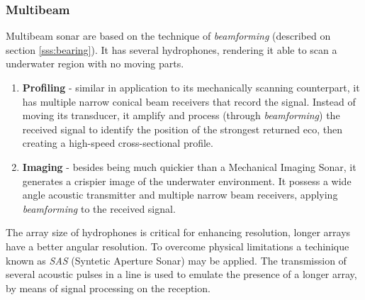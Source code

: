 
\subsubsection{Multibeam}

Multibeam sonar are based on the technique of \textit{beamforming} (described
on section \ref{sss:bearing}). It has several hydrophones, rendering it able to
scan a underwater region with no moving parts.

\begin{enumerate}
  \item \textbf{Profiling} - similar in application to its mechanically scanning
  counterpart, it has multiple narrow conical beam receivers that record the
  signal. Instead of moving its transducer, it amplify and process (through
  \textit{beamforming}) the received signal to identify the position of the
  strongest returned eco, then creating a high-speed cross-sectional profile.
  \item \textbf{Imaging} - besides being much quickier than a Mechanical Imaging
  Sonar, it generates a crispier image of the underwater environment. It possess
  a wide angle acoustic transmitter and multiple narrow beam receivers, applying
  \textit{beamforming} to the received signal.
\end{enumerate}

The array size of hydrophones is critical for enhancing resolution, longer
arrays have a better angular resolution. To overcome physical limitations a
techinique known as \textit{SAS} (Syntetic Aperture Sonar) may be applied. The
transmission of several acoustic pulses in a line is used to emulate the
presence of a longer array, by means of signal processing on the reception.
